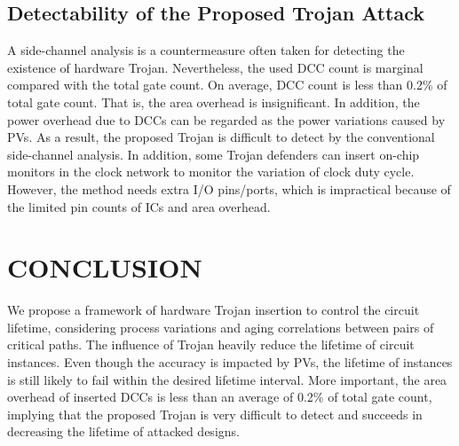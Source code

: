 \subsection{Detectability of the Proposed Trojan Attack}
\label{sec:exp:det}
A side-channel analysis is a countermeasure often taken for detecting the existence of hardware Trojan. Nevertheless, the used DCC count is marginal compared with the total gate count. On average, DCC count is less than 0.2\% of total gate count. That is, the area overhead is insignificant. In addition, the power overhead due to DCCs can be regarded as the power variations caused by PVs. As a result, the proposed Trojan is difficult to detect by the conventional side-channel analysis. In addition, some Trojan defenders can insert on-chip monitors in the clock network to monitor the variation of clock duty cycle. However, the method needs extra I/O pins/ports, which is impractical because of the limited pin counts of ICs and area overhead.


\section{CONCLUSION}
We propose a framework of hardware Trojan insertion to control the circuit lifetime, considering process variations and aging correlations between pairs of critical paths. The influence of Trojan heavily reduce the lifetime of circuit instances. Even though the accuracy is impacted by PVs, the lifetime of instances is still likely to fail within the desired lifetime interval. More important, the area overhead of inserted DCCs is less than an average of 0.2\% of total gate count, implying that the proposed Trojan is very difficult to detect and succeeds in decreasing the lifetime of attacked designs.
